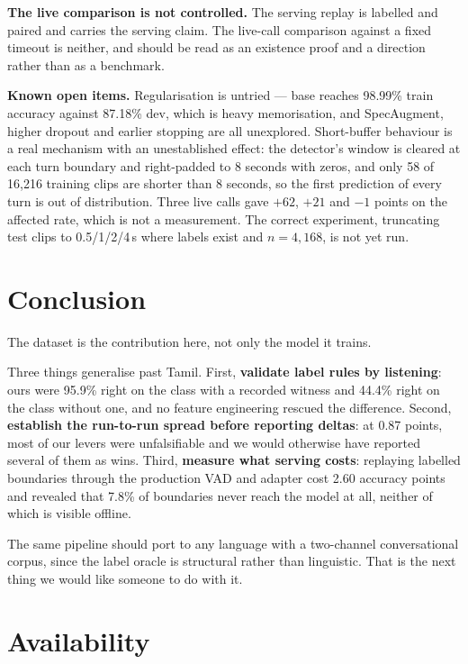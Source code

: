 \documentclass[11pt]{article}
\newcommand{\pct}{\%}
\begin{document}
\textbf{The live comparison is not controlled.} The serving replay is labelled
and paired and carries the serving claim. The live-call comparison against a
fixed timeout is neither, and should be read as an existence proof and a
direction rather than as a benchmark.

\textbf{Known open items.} Regularisation is untried --- base reaches 98.99\pct{}
train accuracy against 87.18\pct{} dev, which is heavy memorisation, and
SpecAugment, higher dropout and earlier stopping are all unexplored. Short-buffer
behaviour is a real mechanism with an unestablished effect: the detector's
window is cleared at each turn boundary and right-padded to 8 seconds with
zeros, and only 58 of 16,216 training clips are shorter than 8 seconds, so the
first prediction of every turn is out of distribution. Three live calls gave
$+62$, $+21$ and $-1$ points on the affected rate, which is not a measurement.
The correct experiment, truncating test clips to 0.5/1/2/4\,s where labels exist
and $n=4{,}168$, is not yet run.

\section{Conclusion}

The dataset is the contribution here, not only the model it trains.

Three things generalise past Tamil. First, \textbf{validate label rules by
listening}: ours were 95.9\pct{} right on the class with a recorded witness and
44.4\pct{} right on the class without one, and no feature engineering rescued
the difference. Second, \textbf{establish the run-to-run spread before reporting
deltas}: at 0.87 points, most of our levers were unfalsifiable and we would
otherwise have reported several of them as wins. Third, \textbf{measure what
serving costs}: replaying labelled boundaries through the production VAD and
adapter cost 2.60 accuracy points and revealed that 7.8\pct{} of boundaries
never reach the model at all, neither of which is visible offline.

The same pipeline should port to any language with a two-channel conversational
corpus, since the label oracle is structural rather than linguistic. That is the
next thing we would like someone to do with it.

\section*{Availability}
\end{document}
